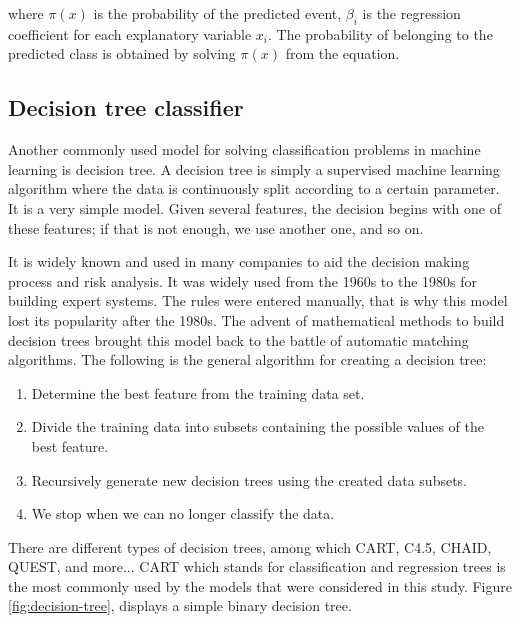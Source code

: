 \documentclass[LaM,binding=0.6cm, english]{sapthesis}
\begin{document}
where \(\pi(x)\) is the probability of the predicted event, \(\beta_i\) is the regression coefficient for each explanatory variable \(x_i\). The probability of belonging to the predicted class is obtained by solving \(\pi(x)\) from the equation.\cite{Hosmer2000}

\subsection{Decision tree classifier} \label{dt_model}

Another commonly used model for solving classification problems in machine learning is decision tree. A decision tree is simply a supervised machine learning algorithm where the data is continuously split according to a certain parameter. It is a very simple model. Given several features, the decision begins with one of these features; if that is not enough, we use another one, and so on. 

\par It is widely known and used in many companies to aid the decision making process and risk analysis. It was widely used from the 1960s to the 1980s for building expert systems. The rules were entered manually, that is why this model lost its popularity after the 1980s. The advent of mathematical methods to build decision trees brought this model back to the battle of automatic matching algorithms. The following is the general algorithm for creating a decision tree:

\begin{enumerate}
	\item Determine the best feature from the training data set.
  	\item Divide the training data into subsets containing the possible values of the best feature.
  	\item Recursively generate new decision trees using the created data subsets.
  	\item We stop when we can no longer classify the data.
\end{enumerate}

There are different types of decision trees, among which CART, C4.5, CHAID, QUEST, and more...\cite{Song2015} CART which stands for classification and regression trees is the most commonly used by the models that were considered in this study. Figure \ref{fig:decision-tree}, displays a simple binary decision tree.
\end{document}
